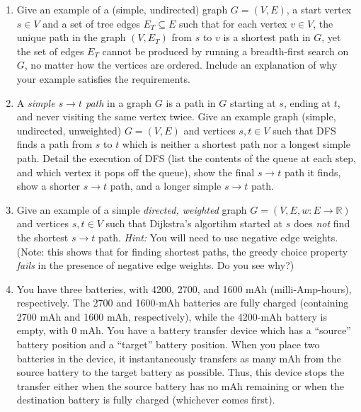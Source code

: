\documentclass[12pt]{article}
\begin{document}
\begin{enumerate}

\newpage

\item  \label{1} Give an example of a (simple, undirected) graph $G=(V, E)$, a start
vertex $s \in V$ and a set of tree edges $E_{T} \subseteq E$ such that
for each vertex $v \in V$, the unique path in the graph $(V,E_{T})$
from $s$ to $v$ is a shortest path in $G$, yet the set of edges $E_{T}$
cannot be produced by running a breadth-first search on $G$, no matter
how the vertices are ordered. Include an
explanation of why your example satisfies the requirements.\\

\pagebreak

\item \label{2} A \emph{simple $s \to t$ path} in a graph $G$ is a path in $G$ starting at $s$, ending at $t$, and never visiting the same vertex twice. Give an example graph (simple, undirected, unweighted) $G=(V,E)$ and vertices $s,t \in V$ such that DFS finds a path from $s$ to $t$ which is neither a shortest path nor a longest simple path. Detail the execution of DFS (list the contents of the queue at each step, and which vertex it pops off the queue), show the final $s \to t$ path it finds, show a shorter $s \to t$ path, and a longer simple $s \to t$ path.
\pagebreak

\item \label{3} Give an example of a simple \emph{directed, weighted} graph $G=(V,E,w\colon E \to \mathbb{R})$ and vertices $s,t \in V$ such that Dijkstra's algortihm started at $s$ does \emph{not} find the shortest $s \to t$ path. \emph{Hint:} You will need to use negative edge weights. (Note: this shows that for finding shortest paths, the greedy choice property \emph{fails} in the presence of negative edge weights. Do you see why?)
\pagebreak

\item \label{4} You have three batteries, with 4200, 2700, and 1600 mAh (milli-Amp-hours), respectively. The 2700 and 1600-mAh batteries are fully charged (containing 2700 mAh and 1600 mAh, respectively), while the 4200-mAh battery is empty, with 0 mAh. You have a battery transfer device which has a ``source'' battery position and a ``target'' battery position. When you place two batteries in the device, it instantaneously transfers as many mAh from the source battery to the target battery as possible. Thus, this device stops the transfer either when the source battery has no mAh remaining or when the destination battery is fully charged (whichever comes first). 


\end{enumerate}
\end{document}

